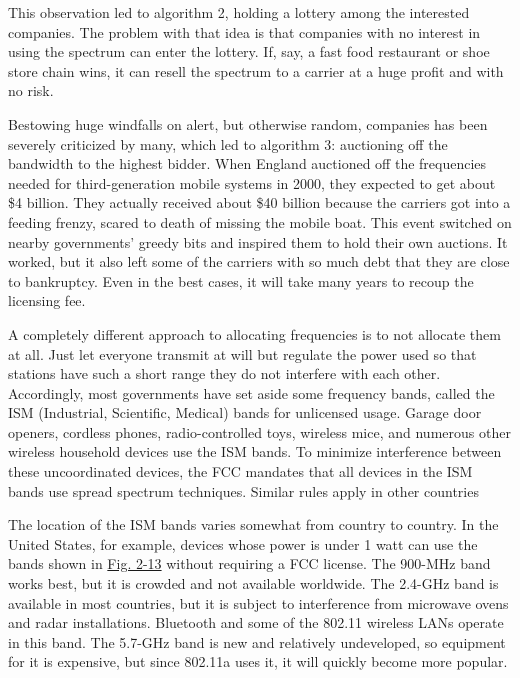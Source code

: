 \documentclass[b5paper,11pt]{memoir}
\begin{document}
This observation led to algorithm 2, holding a lottery among the
interested companies. The problem with that idea is that companies with
no interest in using the spectrum can enter the lottery. If, say, a fast
food restaurant or shoe store chain wins, it can resell the spectrum to
a carrier at a huge profit and with no risk.

Bestowing huge windfalls on alert, but otherwise random, companies has
been severely criticized by many, which led to algorithm 3: auctioning
off the bandwidth to the highest bidder. When England auctioned off the
frequencies needed for third-generation mobile systems in 2000, they
expected to get about \$4 billion. They actually received about \$40
billion because the carriers got into a feeding frenzy, scared to death
of missing the mobile boat. This event switched on nearby governments'
greedy bits and inspired them to hold their own auctions. It worked, but
it also left some of the carriers with so much debt that they are close
to bankruptcy. Even in the best cases, it will take many years to recoup
the licensing fee.

A completely different approach to allocating frequencies is to not
allocate them at all. Just let everyone transmit at will but regulate
the power used so that stations have such a short range they do not
interfere with each other. Accordingly, most governments have set aside
some frequency bands, called the {ISM} ({Industrial, Scientific,
Medical}) bands for unlicensed usage. Garage door openers, cordless
phones, radio-controlled toys, wireless mice, and numerous other
wireless household devices use the ISM bands. To minimize interference
between these uncoordinated devices, the FCC mandates that all devices
in the ISM bands use spread spectrum techniques. Similar rules apply in
other countries

The location of the ISM bands varies somewhat from country to country.
In the United States, for example, devices whose power is under 1 watt
can use the bands shown in
\protect\hyperlink{0130661023_ch02lev1sec3.htmlux5cux23ch02fig13}{Fig.
2-13} without requiring a FCC license. The 900-MHz band works best, but
it is crowded and not available worldwide. The 2.4-GHz band is available
in most countries, but it is subject to interference from microwave
ovens and radar installations. Bluetooth and some of the 802.11 wireless
LANs operate in this band. The 5.7-GHz band is new and relatively
undeveloped, so equipment for it is expensive, but since 802.11a uses
it, it will quickly become more popular.
\end{document}
